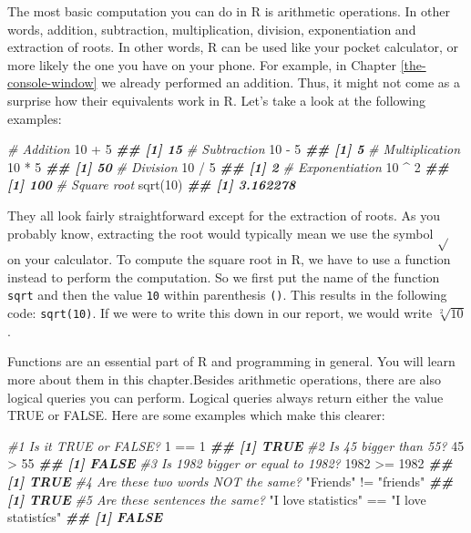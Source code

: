 \documentclass[
]{book}
\newenvironment{Shaded}{\begin{snugshade}}{\end{snugshade}}
\newcommand{\CommentTok}[1]{\textcolor[rgb]{0.56,0.35,0.01}{\textit{#1}}}
\newcommand{\DecValTok}[1]{\textcolor[rgb]{0.00,0.00,0.81}{#1}}
\newcommand{\DocumentationTok}[1]{\textcolor[rgb]{0.56,0.35,0.01}{\textbf{\textit{#1}}}}
\newcommand{\FunctionTok}[1]{\textcolor[rgb]{0.00,0.00,0.00}{#1}}
\newcommand{\NormalTok}[1]{#1}
\newcommand{\SpecialCharTok}[1]{\textcolor[rgb]{0.00,0.00,0.00}{#1}}
\newcommand{\StringTok}[1]{\textcolor[rgb]{0.31,0.60,0.02}{#1}}
\begin{document}
The most basic computation you can do in R is arithmetic operations. In other words, addition, subtraction, multiplication, division, exponentiation and extraction of roots. In other words, R can be used like your pocket calculator, or more likely the one you have on your phone. For example, in Chapter \ref{the-console-window} we already performed an addition. Thus, it might not come as a surprise how their equivalents work in R. Let's take a look at the following examples:

\begin{Shaded}
\begin{Highlighting}[]
\CommentTok{\# Addition}
\DecValTok{10} \SpecialCharTok{+} \DecValTok{5}
\DocumentationTok{\#\# [1] 15}
\CommentTok{\# Subtraction}
\DecValTok{10} \SpecialCharTok{{-}} \DecValTok{5}
\DocumentationTok{\#\# [1] 5}
\CommentTok{\# Multiplication}
\DecValTok{10} \SpecialCharTok{*} \DecValTok{5}
\DocumentationTok{\#\# [1] 50}
\CommentTok{\# Division}
\DecValTok{10} \SpecialCharTok{/} \DecValTok{5}
\DocumentationTok{\#\# [1] 2}
\CommentTok{\# Exponentiation}
\DecValTok{10} \SpecialCharTok{\^{}} \DecValTok{2}
\DocumentationTok{\#\# [1] 100}
\CommentTok{\# Square root}
\FunctionTok{sqrt}\NormalTok{(}\DecValTok{10}\NormalTok{)}
\DocumentationTok{\#\# [1] 3.162278}
\end{Highlighting}
\end{Shaded}

They all look fairly straightforward except for the extraction of roots. As you probably know, extracting the root would typically mean we use the symbol \(\sqrt{}\) on your calculator. To compute the square root in R, we have to use a function instead to perform the computation. So we first put the name of the function \texttt{sqrt} and then the value \texttt{10} within parenthesis \texttt{()}. This results in the following code: \texttt{sqrt(10)}. If we were to write this down in our report, we would write \(\sqrt[2]{10}\).

Functions are an essential part of R and programming in general. You will learn more about them in this chapter.Besides arithmetic operations, there are also logical queries you can perform. Logical queries always return either the value TRUE or FALSE. Here are some examples which make this clearer:

\begin{Shaded}
\begin{Highlighting}[]
\CommentTok{\#1 Is it TRUE or FALSE?}
\DecValTok{1} \SpecialCharTok{==} \DecValTok{1}
\DocumentationTok{\#\# [1] TRUE}
\CommentTok{\#2 Is 45 bigger than 55?}
\DecValTok{45} \SpecialCharTok{\textgreater{}} \DecValTok{55}
\DocumentationTok{\#\# [1] FALSE}
\CommentTok{\#3 Is 1982 bigger or equal to 1982?}
\DecValTok{1982} \SpecialCharTok{\textgreater{}=} \DecValTok{1982}
\DocumentationTok{\#\# [1] TRUE}
\CommentTok{\#4 Are these two words NOT the same?}
\StringTok{"Friends"} \SpecialCharTok{!=} \StringTok{"friends"}
\DocumentationTok{\#\# [1] TRUE}
\CommentTok{\#5 Are these sentences the same?}
\StringTok{"I love statistics"} \SpecialCharTok{==} \StringTok{"I love statistícs"}
\DocumentationTok{\#\# [1] FALSE}
\end{Highlighting}
\end{Shaded}
\end{document}
